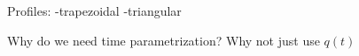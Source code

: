 Profiles:
-trapezoidal 
-triangular


Why do we need time parametrization? Why not just use $q(t)$

